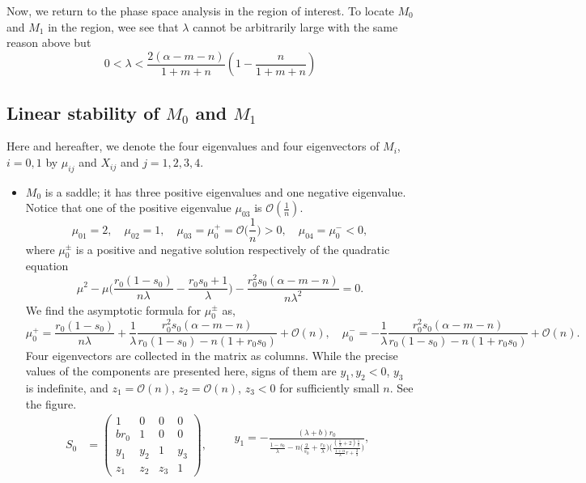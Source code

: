 \documentclass[a4paper,11pt]{article}
\def\BO{{\mathcal{O}}}
\begin{document}
Now, we return to the phase space analysis in the region of interest. To locate $M_0$ and $M_1$ in the region, wee see that $\lambda$ cannot be arbitrarily large with the same reason above but
\begin{equation}
 0< \lambda < \frac{2(\alpha-m-n)}{1+m+n}\left(1-\frac{n}{1+m+n}\right)
\end{equation}

\subsection{Linear stability of $M_0$ and $M_1$}
Here and hereafter, we denote the four eigenvalues and four eigenvectors of $M_i$, $i=0,1$  by $\mu_{ij}$ and $X_{ij}$ and $j=1,2,3,4$.
\begin{itemize}
 \item $M_0$ is a saddle; it has three positive eigenvalues and one negative eigenvalue. Notice that one of the positive eigenvalue $\mu_{03}$ is $\mathcal{O}( \frac{1}{n})$.
 \begin{equation}
  \mu_{01} = 2, \quad \mu_{02}=1, \quad \mu_{03}=\mu_0^+=\BO\Big(\frac{1}{n}\Big)>0, \quad \mu_{04}=\mu_0^{-}<0, 
 \end{equation}
  where $\mu_0^\pm$ is a positive and negative solution respectively of the quadratic equation
 $$ \mu^2 - \mu\Big(\frac{r_0(1-s_0)}{n\lambda}-\frac{r_0s_0+1}{\lambda}\Big) - \frac{r_0^2s_0(\alpha-m-n)}{n\lambda^2}=0.$$
We find the asymptotic formula for $\mu_0^\pm$ as,
$$\mu_0^+ = \frac{r_0(1-s_0)}{n\lambda} + \frac{1}{\lambda}\frac{{r_0^2s_0}(\alpha-m-n)}{ {r_0(1-s_0)}-n(1+r_0s_0) } + \BO(n), \quad \mu_0^- = -\frac{1}{\lambda}\frac{{r_0^2s_0}(\alpha-m-n)}{ {r_0(1-s_0)}-n(1+r_0s_0) } + \BO(n).$$ 
 Four eigenvectors are collected in the matrix as columns. While the precise values of the components are presented here, signs of them are $y_1,y_2<0$, $y_3$ is indefinite, and $z_1=\BO(n)$, $z_2=\BO(n)$, $z_3<0$ for sufficiently small $n$. See the figure.
\begin{align*}
 S_0&=
 \begin{pmatrix}
    1 & 0 & 0 & 0\\
    br_0 & 1 & 0 & 0\\
    y_1 & y_2 & 1 & y_3\\
    z_1 & z_2 & z_3 &1
 \end{pmatrix},
 \quad \quad
 \begin{array}{l}
   y_1=-\frac{(\lambda+b)r_0}{\frac{1-s_0}{\lambda} - n\Big(\frac{2}{s_0}+\frac{r_0}{\lambda}\Big)\Big(\frac{(\frac{1}{\lambda}+2)\frac{1}{s}}{ \frac{1+\alpha}{\lambda}r + \frac{2}{s} }\Big) },\\

\end{array}
\end{align*}
\end{itemize}
\end{document}
